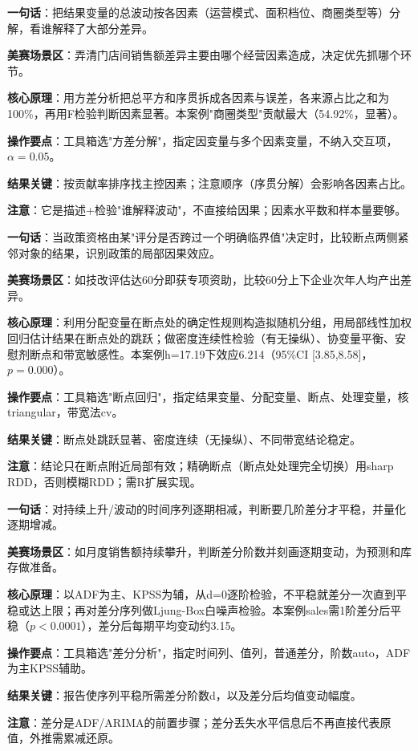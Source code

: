 \begin{algobrief}
\textbf{一句话}：把结果变量的总波动按各因素（运营模式、面积档位、商圈类型等）分解，看谁解释了大部分差异。

\textbf{美赛场景区}：弄清门店间销售额差异主要由哪个经营因素造成，决定优先抓哪个环节。

\textbf{核心原理}：用方差分析把总平方和序贯拆成各因素与误差，各来源占比之和为100\%，再用F检验判断因素显著。本案例"商圈类型"贡献最大（54.92\%，显著）。

\textbf{操作要点}：工具箱选"方差分解"，指定因变量与多个因素变量，不纳入交互项，$\alpha=0.05$。

\textbf{结果关键}：按贡献率排序找主控因素；注意顺序（序贯分解）会影响各因素占比。

\textbf{注意}：它是描述+检验"谁解释波动"，不直接给因果；因素水平数和样本量要够。
\end{algobrief}


\begin{algobrief}
\textbf{一句话}：当政策资格由某"评分是否跨过一个明确临界值"决定时，比较断点两侧紧邻对象的结果，识别政策的局部因果效应。

\textbf{美赛场景区}：如技改评估达60分即获专项资助，比较60分上下企业次年人均产出差异。

\textbf{核心原理}：利用分配变量在断点处的确定性规则构造拟随机分组，用局部线性加权回归估计结果在断点处的跳跃；做密度连续性检验（有无操纵）、协变量平衡、安慰剂断点和带宽敏感性。本案例h=17.19下效应6.214（95\%CI [3.85,8.58]，$p=0.000$）。

\textbf{操作要点}：工具箱选"断点回归"，指定结果变量、分配变量、断点、处理变量，核triangular，带宽法cv。

\textbf{结果关键}：断点处跳跃显著、密度连续（无操纵）、不同带宽结论稳定。

\textbf{注意}：结论只在断点附近局部有效；精确断点（断点处处理完全切换）用sharp RDD，否则模糊RDD；需R扩展实现。
\end{algobrief}


\begin{algobrief}
\textbf{一句话}：对持续上升/波动的时间序列逐期相减，判断要几阶差分才平稳，并量化逐期增减。

\textbf{美赛场景区}：如月度销售额持续攀升，判断差分阶数并刻画逐期变动，为预测和库存做准备。

\textbf{核心原理}：以ADF为主、KPSS为辅，从d=0逐阶检验，不平稳就差分一次直到平稳或达上限；再对差分序列做Ljung-Box白噪声检验。本案例sales需1阶差分后平稳（$p<0.0001$），差分后每期平均变动约3.15。

\textbf{操作要点}：工具箱选"差分分析"，指定时间列、值列，普通差分，阶数auto，ADF为主KPSS辅助。

\textbf{结果关键}：报告使序列平稳所需差分阶数d，以及差分后均值变动幅度。

\textbf{注意}：差分是ADF/ARIMA的前置步骤；差分丢失水平信息后不再直接代表原值，外推需累减还原。
\end{algobrief}


